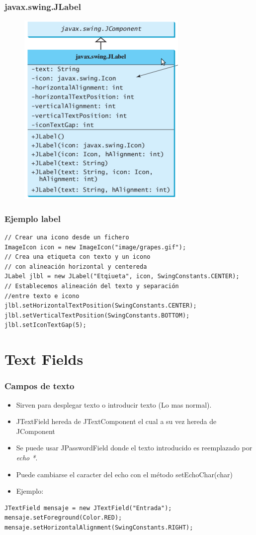 \documentclass{beamer}
\begin{document}
\begin{frame}
\frametitle{javax.swing.JLabel} 
\begin{figure}
\includegraphics[scale=0.7]{imagenes/label.png} 
\end{figure} 
\end{frame}

\begin{frame}[fragile]
\frametitle{Ejemplo label}
\begin{verbatim}
// Crear una icono desde un fichero
ImageIcon icon = new ImageIcon("image/grapes.gif");
// Crea una etiqueta con texto y un icono
// con alineación horizontal y centereda
JLabel jlbl = new JLabel("Etqiueta", icon, SwingConstants.CENTER);
// Establecemos alineación del texto y separación 
//entre texto e icono
jlbl.setHorizontalTextPosition(SwingConstants.CENTER);
jlbl.setVerticalTextPosition(SwingConstants.BOTTOM);
jlbl.setIconTextGap(5);
\end{verbatim}
\end{frame}

\section{Text Fields}
\begin{frame}[fragile]
\frametitle{Campos de texto}
\begin{itemize}[<+->]
\item Sirven para desplegar texto o introducir texto (Lo mas normal).
\item \alert{JTextField} hereda de \alert{JTextComponent} el cual a su vez hereda de \alert{JComponent}
\item Se puede usar \alert{JPasswordField} donde el texto introducido es reemplazado por \emph{echo *}.
\item Puede cambiarse el caracter del echo con el método \alert{setEchoChar(char)}
\item Ejemplo:
\end{itemize}
\pause
\begin{verbatim}
JTextField mensaje = new JTextField("Entrada");
mensaje.setForeground(Color.RED);
mensaje.setHorizontalAlignment(SwingConstants.RIGHT);
\end{verbatim}
\end{frame}
\end{document}
